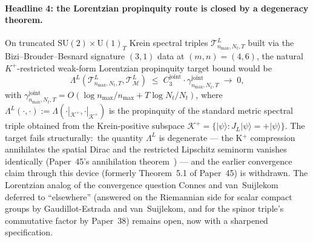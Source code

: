 \documentclass[11pt,a4paper]{article}
\theoremstyle{plain}
\theoremstyle{definition}
\newcommand{\nmax}{n_{\max}}
\newcommand{\Nt}{N_{t}}
\newcommand{\JL}{J_{L}}
\newcommand{\Kplus}{\mathcal{K}^{+}}
\newcommand{\Tcal}{\mathcal{T}}
\newcommand{\Manifold}{\mathcal{M}}
\newcommand{\SU}{\mathrm{SU}}
\newcommand{\Uone}{\mathrm{U}(1)}
\newcommand{\Lprop}{\Lambda^{L}}
\newcommand{\gvc}[2]{#2}
\begin{document}
\paragraph{Headline 4: the Lorentzian propinquity route is closed by a
degeneracy theorem.}
On truncated $\SU(2)\times \Uone_{T}$ Krein spectral triples
$\Tcal^{L}_{\nmax,\Nt,T}$ built via the Bizi--Brouder--Besnard
\cite{bizi_brouder_besnard2018} signature $(3,1)$ data at
$(m,n) = (4,6)$, the natural $K^{+}$-restricted weak-form
Lorentzian propinquity target bound would be
\begin{equation}
\Lprop(\Tcal^{L}_{\nmax,\Nt,T}, \Tcal^{L}_{\Manifold})
\;\le\; C_3^{\mathrm{joint}} \cdot \gamma^{\mathrm{joint}}_{\nmax,\Nt,T}
\;\longrightarrow\; 0,
\label{eq:headline_4}
\end{equation}
with $\gamma^{\mathrm{joint}}_{\nmax,\Nt,T}
= O(\log \nmax / \nmax + T\log\Nt/\Nt)$, where
$\Lprop(\cdot,\cdot) := \Lambda(\cdot|_{\Kplus},\cdot|_{\Kplus})$ is
the propinquity of the standard metric spectral triple obtained from
the Krein-positive subspace $\Kplus = \{|\psi\rangle : \JL|\psi\rangle
= +|\psi\rangle\}$.  The target fails structurally:\ \gvc{p45-rates-spatial}{the quantity $\Lprop$ is
degenerate --- the K$^{+}$ compression annihilates the spatial Dirac
and the restricted Lipschitz seminorm vanishes identically
(Paper~45's annihilation theorem~\cite{paper45})} --- and the earlier
convergence claim through this device (formerly Theorem~5.1 of
Paper~45) is withdrawn.  The Lorentzian analog of the convergence
question Connes and van~Suijlekom \cite{connes_vs2021} deferred to
``elsewhere'' (answered on the Riemannian side for scalar compact groups by
Gaudillot-Estrada and van~Suijlekom, and for the spinor triple's
commutative factor by Paper~38) remains
open, now with a sharpened specification.
\end{document}
